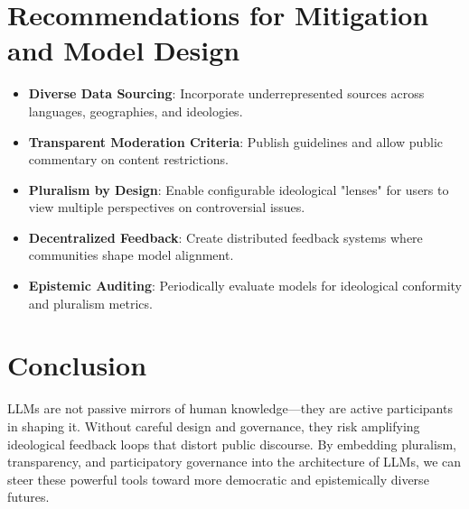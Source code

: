 \documentclass[11pt]{article}
\begin{document}
\section{Recommendations for Mitigation and Model Design}
\begin{itemize}
  \item \textbf{Diverse Data Sourcing}: Incorporate underrepresented sources across languages, geographies, and ideologies.
  \item \textbf{Transparent Moderation Criteria}: Publish guidelines and allow public commentary on content restrictions.
  \item \textbf{Pluralism by Design}: Enable configurable ideological "lenses" for users to view multiple perspectives on controversial issues.
  \item \textbf{Decentralized Feedback}: Create distributed feedback systems where communities shape model alignment.
  \item \textbf{Epistemic Auditing}: Periodically evaluate models for ideological conformity and pluralism metrics.
\end{itemize}

\section{Conclusion}
LLMs are not passive mirrors of human knowledge—they are active participants in shaping it. Without careful design and governance, they risk amplifying ideological feedback loops that distort public discourse. By embedding pluralism, transparency, and participatory governance into the architecture of LLMs, we can steer these powerful tools toward more democratic and epistemically diverse futures.



\end{document}
